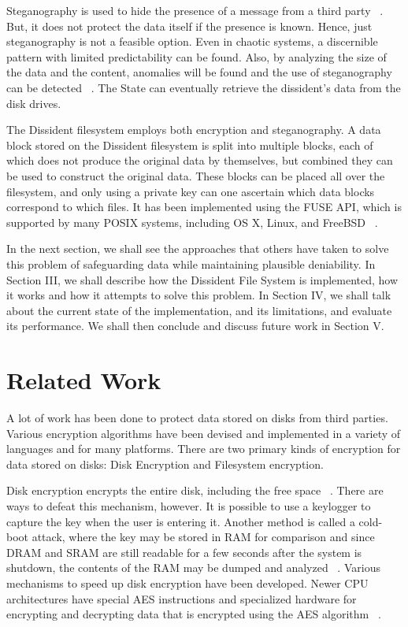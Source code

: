 \documentclass[10pt,twocolumn]{article}
\begin{document}
Steganography is used to hide the presence of a message from a third party ~\cite{ex3}. But, it does not protect the data itself if the presence is known. Hence, just steganography is not a feasible option. Even in chaotic systems, a discernible pattern with limited predictability can be found. Also, by analyzing the size of the data and the content, anomalies will be found and the use of steganography can be detected ~\cite{ex3}. The State can eventually retrieve the dissident’s data from the disk drives. 

The Dissident filesystem employs both encryption and steganography. A data block stored on the Dissident filesystem is split into multiple blocks, each of which does not produce the original data by themselves, but combined they can be used to construct the original data. These blocks can be placed all over the filesystem, and only using a private key can one ascertain which data blocks correspond to which files. It has been implemented using the FUSE API, which is supported by many POSIX systems, including OS X, Linux, and FreeBSD ~\cite{ex1}. 

In the next section, we shall see the approaches that others have taken to solve this problem of safeguarding data while maintaining plausible deniability. In Section III, we shall describe how the Dissident File System is implemented, how it works and how it attempts to solve this problem. In Section IV, we shall talk about the current state of the implementation, and its limitations, and evaluate its performance. We shall then conclude and discuss future work in Section V. 

\section{Related Work}

A lot of work has been done to protect data stored on disks from third parties. Various encryption algorithms have been devised and implemented in a variety of languages and for many platforms. There are two primary kinds of encryption for data stored on disks: Disk Encryption and Filesystem encryption. 

Disk encryption encrypts the entire disk, including the free space ~\cite{ex4,ex5,ex6}. There are ways to defeat this mechanism, however. It is possible to use a keylogger to capture the key when the user is entering it. Another method is called a cold-boot attack, where the key may be stored in RAM for comparison and since DRAM and SRAM are still readable for a few seconds after the system is shutdown, the contents of the RAM may be dumped and analyzed ~\cite{ex7}. Various mechanisms to speed up disk encryption have been developed. Newer CPU architectures have special AES instructions and specialized hardware for encrypting and decrypting data that is encrypted using the AES algorithm ~\cite{ex8}. 
\end{document}
